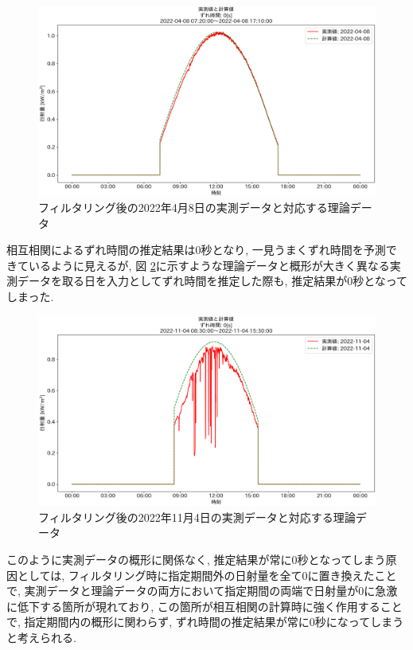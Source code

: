 \documentclass[a4j,12pt,]{jarticle}
\begin{document}
\begin{figure}[H]
  \begin{center}
    \includegraphics[width=160mm]{2022-04-08_partial_corr.png}
    \caption{フィルタリング後の2022年4月8日の実測データと対応する理論データ}
    \label{p6}
  \end{center}
\end{figure}

相互相関によるずれ時間の推定結果は0秒となり, 一見うまくずれ時間を予測できているように見えるが, 図 \ref{p7}に示すような理論データと概形が大きく異なる実測データを取る日を入力としてずれ時間を推定した際も, 推定結果が0秒となってしまった.

\begin{figure}[H]
  \begin{center}
    \includegraphics[width=160mm]{2022-11-04_partial_corr.png}
    \caption{フィルタリング後の2022年11月4日の実測データと対応する理論データ}
    \label{p7}
  \end{center}
\end{figure}

このように実測データの概形に関係なく, 推定結果が常に0秒となってしまう原因としては, フィルタリング時に指定期間外の日射量を全て0に置き換えたことで, 実測データと理論データの両方において指定期間の両端で日射量が0に急激に低下する箇所が現れており, この箇所が相互相関の計算時に強く作用することで, 指定期間内の概形に関わらず, ずれ時間の推定結果が常に0秒になってしまうと考えられる.
\end{document}
